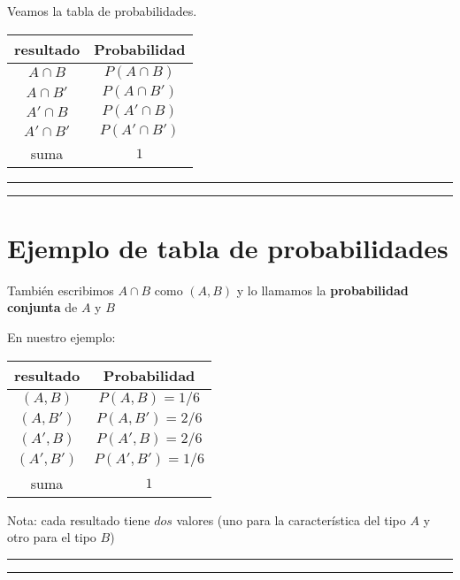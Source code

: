 \documentclass[
]{book}
\begin{document}
Veamos la tabla de probabilidades.

\begin{longtable}[]{@{}cc@{}}
\toprule
resultado & Probabilidad \\
\midrule
\endhead
\(A\cap B\) & \(P(A\cap B)\) \\
\(A\cap B'\) & \(P(A\cap B')\) \\
\(A'\cap B\) & \(P(A'\cap B)\) \\
\(A'\cap B'\) & \(P(A'\cap B')\) \\
suma & \(1\) \\
\bottomrule
\end{longtable}

\begin{center}\rule{0.5\linewidth}{0.5pt}\end{center}

\begin{center}\rule{0.5\linewidth}{0.5pt}\end{center}

\hypertarget{ejemplo-de-tabla-de-probabilidades}{%
\section{Ejemplo de tabla de probabilidades}\label{ejemplo-de-tabla-de-probabilidades}}

También escribimos \(A \cap B\) como \((A,B)\) y lo llamamos la \textbf{probabilidad conjunta} de \(A\) y \(B\)

En nuestro ejemplo:

\begin{longtable}[]{@{}cc@{}}
\toprule
resultado & Probabilidad \\
\midrule
\endhead
\((A,B)\) & \(P(A, B)=1/6\) \\
\((A,B')\) & \(P(A,B')=2/6\) \\
\((A', B)\) & \(P(A', B)=2/6\) \\
\((A', B')\) & \(P(A', B')=1/6\) \\
suma & \(1\) \\
\bottomrule
\end{longtable}

Nota: cada resultado tiene \(dos\) valores (uno para la característica del tipo \(A\) y otro para el tipo \(B\))

\begin{center}\rule{0.5\linewidth}{0.5pt}\end{center}

\begin{center}\rule{0.5\linewidth}{0.5pt}\end{center}
\end{document}
